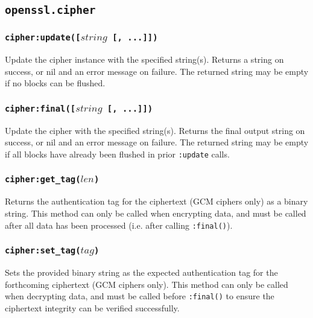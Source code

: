 \documentclass[11pt, oneside]{memoir}
\newcommand*{\fn}[1]{\texttt{#1}\xspace}
\newcounter{toccols}
\newenvironment{Module}[1]{
	\subsection{\texttt{#1}}
	\addtocontents{toc}{
		\protect\begin{multicols}{\value{toccols}}
	}
}{
	\addtocontents{toc}{\protect\end{multicols}}
}
\begin{document}
\begin{Module}{openssl.cipher}
\subsubsection[\fn{cipher:update}]{\fn{cipher:update([$string$ [, ...]])}}

Update the cipher instance with the specified string(s). Returns a string on success, or nil and an error message on failure. The returned string may be empty if no blocks can be flushed.

\subsubsection[\fn{cipher:final}]{\fn{cipher:final([$string$ [, ...]])}}

Update the cipher with the specified string(s). Returns the final output string on success, or nil and an error message on failure. The returned string may be empty if all blocks have already been flushed in prior \fn{:update} calls.

\subsubsection[\fn{cipher:get\_tag}]{\fn{cipher:get\_tag($len$)}}

Returns the authentication tag for the ciphertext (GCM ciphers only) as a binary string. This method can only be called when encrypting data, and must be called after all data has been processed (i.e. after calling \fn{:final()}).

\subsubsection[\fn{cipher:set\_tag}]{\fn{cipher:set\_tag($tag$)}}

Sets the provided binary string as the expected authentication tag for the forthcoming ciphertext (GCM ciphers only). This method can only be called when decrypting data, and must be called before \fn{:final()} to ensure the ciphertext integrity can be verified successfully.

\end{Module}
\end{document}
